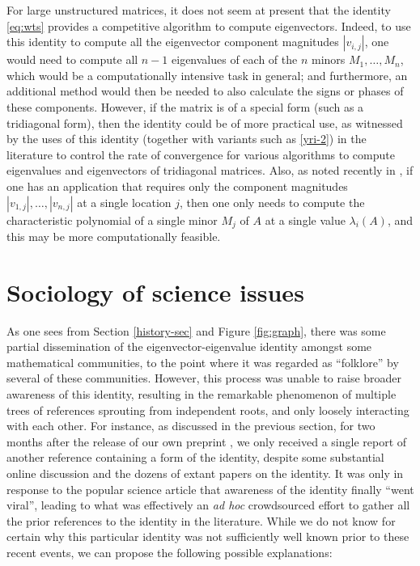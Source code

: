 \documentclass{amsart}
\begin{document}
For large unstructured matrices, it does not seem at present that the identity \eqref{eq:wts} provides a competitive algorithm to compute eigenvectors.  Indeed, to use this identity to compute all the eigenvector component magnitudes $|v_{i,j}|$, one would need to compute all $n-1$ eigenvalues of each of the $n$ minors $M_1,\dots,M_n$, which would be a computationally intensive task in general; and furthermore, an additional method would then be needed to also calculate the signs or phases of these components.  However, if the matrix is of a special form (such as a tridiagonal form), then the identity could be of more practical use, as witnessed by the uses of this identity (together with variants such as \eqref{yri-2}) in the literature to control the rate of convergence for various algorithms to compute eigenvalues and eigenvectors of tridiagonal matrices.  Also, as noted recently in \cite{Kausel2018}, if one has an application that requires only the component magnitudes $|v_{1,j}|,\dots,|v_{n,j}|$ at a single location $j$, then one only needs to compute the characteristic polynomial of a single minor $M_j$ of $A$ at a single value $\lambda_i(A)$, and this may be more computationally feasible.

\section{Sociology of science issues}

As one sees from Section \ref{history-sec} and Figure \ref{fig:graph}, there was some partial dissemination of the eigenvector-eigenvalue identity amongst some mathematical communities, to the point where it was regarded as ``folklore'' by several of these communities.  However, this process was unable to raise broader awareness of this identity, resulting in the remarkable phenomenon of multiple trees of references sprouting from independent roots, and only loosely interacting with each other.  For instance, as discussed in the previous section, for two months after the release of our own preprint \cite{DPTZ}, we only received a single report of another reference \cite{2019arXiv190505314F} containing a form of the identity, despite some substantial online discussion and the dozens of extant papers on the identity.  It was only in response to the popular science article \cite{wolchover-2019} that awareness of the identity finally ``went viral'', leading to what was effectively an \emph{ad hoc} crowdsourced effort to gather all the prior references to the identity in the literature.    
While we do not know for certain why this particular identity was not sufficiently well known prior to these recent events, we can propose the following possible explanations:
\end{document}
